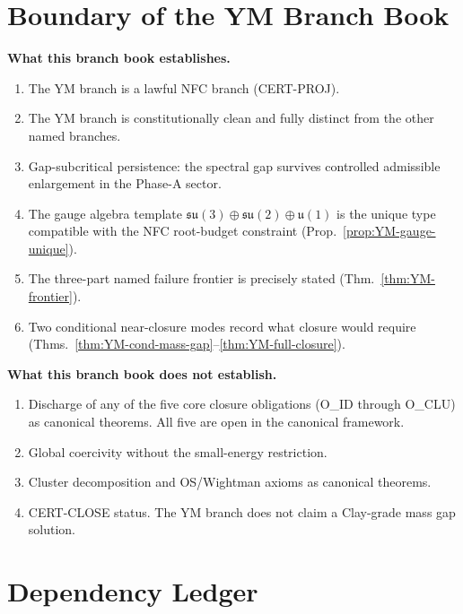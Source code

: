 \documentclass[12pt,oneside]{amsbook}
\theoremstyle{plain}
\theoremstyle{definition}
\theoremstyle{remark}
\begin{document}
\section{Boundary of the YM Branch Book}

\textbf{What this branch book establishes.}
\begin{enumerate}
 \item The YM branch is a lawful NFC branch (CERT-PROJ).
 \item The YM branch is constitutionally clean and fully distinct
 from the other named branches.
 \item Gap-subcritical persistence: the spectral gap survives
 controlled admissible enlargement in the Phase-A sector.
 \item The gauge algebra template $\mathfrak{su}(3)\oplus
 \mathfrak{su}(2)\oplus\mathfrak{u}(1)$ is the unique
 type compatible with the NFC root-budget constraint
 (Prop.~\ref{prop:YM-gauge-unique}).
 \item The three-part named failure frontier is precisely stated
 (Thm.~\ref{thm:YM-frontier}).
 \item Two conditional near-closure modes record what closure
 would require (Thms.~\ref{thm:YM-cond-mass-gap}--\ref{thm:YM-full-closure}).
\end{enumerate}

\textbf{What this branch book does not establish.}
\begin{enumerate}
 \item Discharge of any of the five core closure obligations
 (O\_ID through O\_CLU) as canonical theorems. All five
 are open in the canonical framework.
 \item Global coercivity without the small-energy restriction.
 \item Cluster decomposition and OS/Wightman axioms as canonical
 theorems.
 \item CERT-CLOSE status. The YM branch does not claim a
 Clay-grade mass gap solution.
\end{enumerate}

\section{Dependency Ledger}
\end{document}
